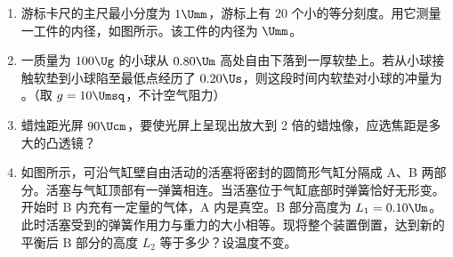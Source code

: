 \documentclass[\gkver]{gaokaozhenti}
\begin{document}
\begin{enumerate}
\item
游标卡尺的主尺最小分度为 $1\Umm$，游标上有 20 个小的等分刻度。用它测量一工件的内径，如图所示。该工件的内径为 $\Umm$。



\item
一质量为 $100\Ug$ 的小球从 $0.80\Um$ 高处自由下落到一厚软垫上。若从小球接触软垫到小球陷至最低点经历了 $0.20\Us$，则这段时间内软垫对小球的冲量为 \tkanswer[2cm]{$0.6\UNs$}。（取 $g = 10\Umsq$，不计空气阻力）

\jdanswer{
$0.6\UNs$
}


\item
蜡烛距光屏 $90\Ucm$，要使光屏上呈现出放大到 2 倍的蜡烛像，应选焦距是多大的凸透镜？

\jdanswer{
$20\Ucm$
}


\item
如图所示，可沿气缸壁自由活动的活塞将密封的圆筒形气缸分隔成 A、B 两部分。活塞与气缸顶部有一弹簧相连。当活塞位于气缸底部时弹簧恰好无形变。开始时 B 内充有一定量的气体，A 内是真空。B 部分高度为 $L_{1} = 0.10\Um$。此时活塞受到的弹簧作用力与重力的大小相等。现将整个装置倒置，达到新的平衡后 B 部分的高度 $L_{2}$ 等于多少？设温度不变。


\end{enumerate}
\end{document}
